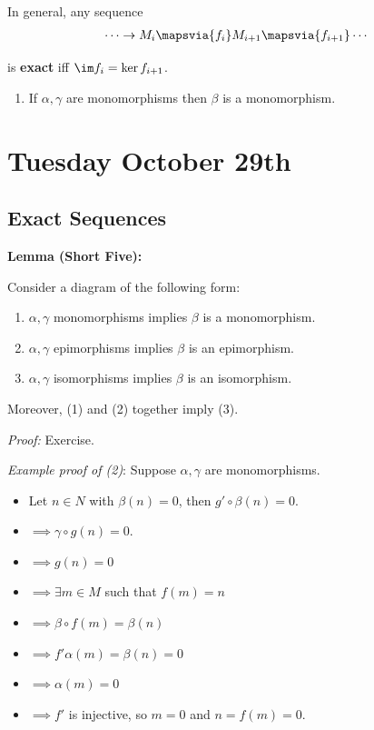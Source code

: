 In general, any sequence
\begin{align*}
\cdots \to M_i \mapsvia{f_i} M_{i+1} \mapsvia{f_{i+1}} \cdots
\end{align*}

is \textbf{exact} iff \(\im f_i = \ker f_{i+1}\).

\begin{enumerate}
\def\labelenumi{\arabic{enumi}.}
\tightlist
\item
  If \(\alpha, \gamma\) are monomorphisms then \(\beta\) is a
  monomorphism.
\end{enumerate}

\hypertarget{tuesday-october-29th}{%
\section{Tuesday October 29th}\label{tuesday-october-29th}}

\hypertarget{exact-sequences-1}{%
\subsection{Exact Sequences}\label{exact-sequences-1}}

\textbf{Lemma (Short Five):}

Consider a diagram of the following form:

\begin{center}\end{center}

\begin{enumerate}
\def\labelenumi{\arabic{enumi}.}
\item
  \(\alpha, \gamma\) monomorphisms implies \(\beta\) is a monomorphism.
\item
  \(\alpha, \gamma\) epimorphisms implies \(\beta\) is an epimorphism.
\item
  \(\alpha, \gamma\) isomorphisms implies \(\beta\) is an isomorphism.
\end{enumerate}

Moreover, (1) and (2) together imply (3).

\emph{Proof:} Exercise.

\emph{Example proof of (2)}: Suppose \(\alpha, \gamma\) are
monomorphisms.

\begin{itemize}
\tightlist
\item
  Let \(n\in N\) with \(\beta(n) = 0\), then \(g' \circ \beta(n) = 0\).
\item
  \(\implies \gamma \circ g (n) = 0\).
\item
  \(\implies g(n) = 0\)
\item
  \(\implies \exists m\in M\) such that \(f(m) = n\)
\item
  \(\implies \beta \circ f (m) = \beta(n)\)
\item
  \(\implies f' \alpha(m) = \beta (n) = 0\)
\item
  \(\implies \alpha(m) = 0\)
\item
  \(\implies f'\) is injective, so \(m=0\) and \(n=f(m) = 0\).
\end{itemize}


